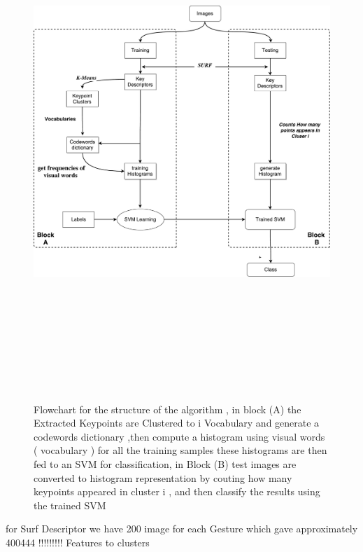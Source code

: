 \begin{figure}[H]
\centering
\includegraphics[width=17cm, height=19.5cm ]{img/myalgo.pdf}
\caption{Flowchart for the structure of the algorithm , in block (A) the Extracted Keypoints  are Clustered to i Vocabulary and generate a codewords dictionary  ,then compute a histogram using visual words ( vocabulary ) for all the training samples these histograms are then fed to an SVM for classification, in Block (B) test images are converted to histogram representation by couting how many keypoints appeared in cluster i ,  and then classify the results using the trained SVM }
\label{fig:algo1}
\end{figure}


for Surf Descriptor we have 200 image for each Gesture  which gave approximately 400444 !!!!!!!!! Features to clusters 

